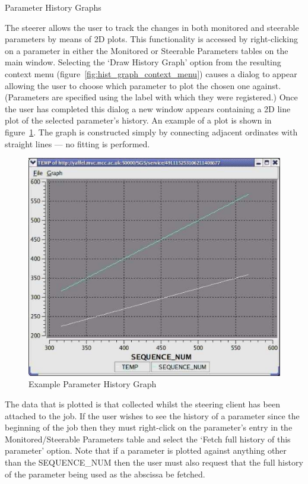 \documentclass[a4paper,twoside]{article}
\begin{document}

\begin{section}{Parameter History Graphs}
\label{sec:hist_graphs}

The steerer allows the user to track the changes in both monitored and
steerable parameters by means of 2D plots.  This functionality is
accessed by right-clicking on a parameter in either the Monitored or
Steerable Parameters tables on the main window.  Selecting the `Draw
History Graph' option from the resulting context menu
(figure~\ref{fig:hist_graph_context_menu}) causes a dialog to appear allowing
the user to choose which parameter to plot the chosen one against.
(Parameters are specified using the label with which they were
registered.)  Once the user has completed this dialog a new window
appears containing a 2D line plot of the selected parameter's
history. An example of a plot is shown in
figure~\ref{fig:eg_param_hist_plot}.  The graph is constructed simply
by connecting adjacent ordinates with straight lines --- no fitting is
performed.

\begin{figure}
\centerline{\includegraphics{hist_plot_2curves.png}}
\caption{Example Parameter History Graph}
\label{fig:eg_param_hist_plot}
\end{figure}

The data that is plotted is that collected whilst the steering client
has been attached to the job. If the user wishes to see the history of
a parameter since the beginning of the job then they must right-click
on the parameter's entry in the Monitored/Steerable Parameters table
and select the `Fetch full history of this parameter' option.  Note
that if a parameter is plotted against anything other than the
SEQUENCE\_NUM then the user must also request that the full history of
the parameter being used as the abscissa be fetched.


\end{section}
\end{document}
